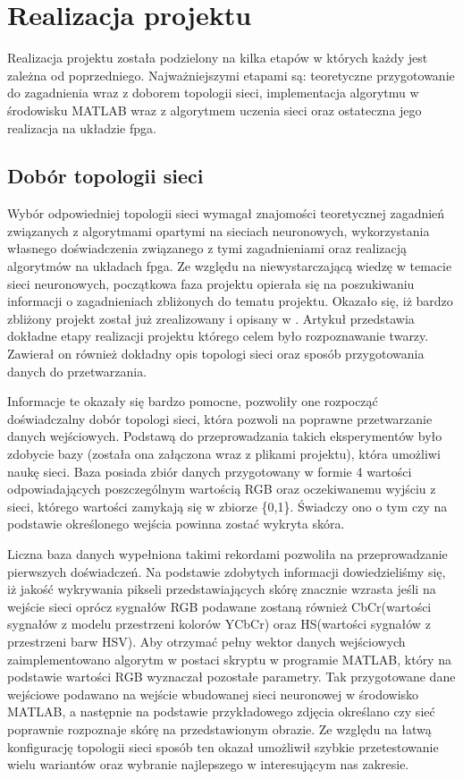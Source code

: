 \chapter{Realizacja projektu}
\label{cha:realizacja}

Realizacja projektu została podzielony na kilka etapów w których każdy jest zależna od  poprzedniego. Najważniejszymi etapami są: teoretyczne przygotowanie do zagadnienia wraz z doborem topologii sieci, implementacja algorytmu w środowisku MATLAB wraz z algorytmem uczenia sieci oraz ostateczna jego realizacja na układzie fpga. 
\section{Dobór topologii sieci}

Wybór odpowiedniej topologii sieci wymagał znajomości teoretycznej zagadnień związanych z algorytmami opartymi na sieciach neuronowych, wykorzystania własnego doświadczenia związanego z tymi zagadnieniami oraz realizacją algorytmów na układach fpga. Ze względu na niewystarczającą wiedzę w temacie sieci neuronowych, początkowa faza projektu opierała się na poszukiwaniu informacji o zagadnieniach zbliżonych do tematu projektu. Okazało się, iż bardzo zbliżony projekt został już zrealizowany i opisany w \cite{fdciuss}. Artykuł przedstawia dokładne etapy realizacji projektu którego celem było rozpoznawanie twarzy. Zawierał on również dokładny opis topologi sieci oraz sposób przygotowania danych do przetwarzania. 

Informacje te okazały się bardzo pomocne, pozwoliły one rozpocząć doświadczalny dobór topologi sieci, która pozwoli na poprawne przetwarzanie danych wejściowych. 
Podstawą do przeprowadzania takich eksperymentów było zdobycie bazy (została ona załączona wraz z plikami projektu), która umożliwi naukę sieci. Baza posiada zbiór danych przygotowany w formie 4 wartości odpowiadających poszczególnym wartością RGB oraz oczekiwanemu wyjściu z sieci, którego wartości zamykają się w zbiorze \{0,1\}. Świadczy ono o tym czy na podstawie określonego wejścia powinna zostać wykryta skóra.

Liczna baza danych wypełniona takimi rekordami pozwoliła na przeprowadzanie pierwszych doświadczeń. Na podstawie zdobytych informacji dowiedzieliśmy się, iż jakość wykrywania pikseli przedstawiających skórę znacznie wzrasta jeśli na wejście sieci oprócz sygnałów RGB podawane zostaną również CbCr(wartości sygnałów z modelu przestrzeni kolorów YCbCr) oraz HS(wartości sygnałów z przestrzeni barw HSV). Aby otrzymać pełny wektor danych wejściowych zaimplementowano algorytm w postaci skryptu w programie MATLAB, który na podstawie wartości RGB wyznaczał pozostałe parametry. Tak przygotowane dane wejściowe podawano na wejście wbudowanej sieci neuronowej w środowisko MATLAB, a następnie na podstawie przykładowego zdjęcia określano czy sieć poprawnie rozpoznaje skórę na przedstawionym obrazie. Ze względu na łatwą konfigurację topologii sieci sposób ten okazał umożliwił szybkie przetestowanie wielu wariantów oraz wybranie najlepszego w interesującym nas zakresie.

